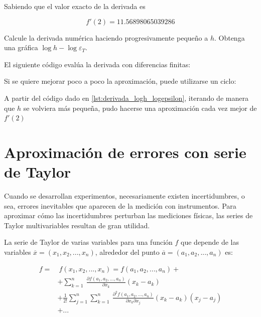 \begin{ex}
	Sabiendo que el valor exacto de la derivada es

	\begin{equation*}
		f'(2) =11.56898065039286
	\end{equation*}

	Calcule la derivada numérica haciendo progresivamente pequeño a $h$.
	Obtenga una gráfica $\log h - \log \varepsilon_T$.

	\begin{solution}

		El siguiente código evalúa la derivada con diferencias finitas:

		

		Si se quiere mejorar poco a poco la aproximación, puede
		utilizarse un ciclo:

		

		A partir del código dado en \ref{lst:derivada_logh_logepsilon},
		iterando de manera que $h$ se volviera más pequeña, pudo hacerse
		una aproximación cada vez mejor de $f'(2)$

	\end{solution}
\end{ex}

\section{Aproximación de errores con serie de Taylor}

Cuando se desarrollan experimentos, necesariamente existen incertidumbres, o
sea, errores inevitables que aparecen de la medición con instrumentos. Para
aproximar cómo las incertidumbres perturban las mediciones físicas, las series
de Taylor multivariables resultan de gran utilidad.

\begin{definition}

	La serie de Taylor de varias variables para una función $f$ que depende
	de las variables $\overline{x} = (x_1, x_2, ..., x_n)$, alrededor del
	punto $ \overline{a} = (a_1, a_2, ..., a_n)$ es:

	\begin{align*}
		f = & \ f(x_1, x_2, ..., x_n) = f(a_1, a_2, ..., a_n) + \\ 
		    & + \sum_{k=1}^{n} \
		    \frac{\partial f(a_1,a_2,...,a_n)}{\partial x_k}(x_k-a_k)\\
		    & + \frac{1}{2!} \sum_{j=1}^{n} \sum_{k=1}^{n} \
		    \frac{\partial^2 f(a_1,a_2,...,a_n)}{\partial x_k \partial
		    x_j}(x_k-a_k)(x_j-a_j)\\
		    & + ...
	\end{align*}
	\label{eq:def-taylor-multi}

\end{definition}

